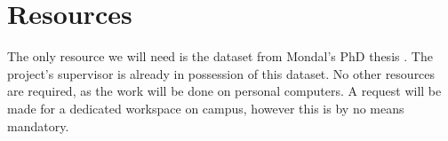 \documentclass[informationsecurity]{gucmasterproject}
\begin{document}
%           

\section{Resources}
\label{sec:milestones-resources}
The only resource we will need is the dataset from Mondal's PhD thesis \cite{mondal}. The project's supervisor is already in possession of this dataset.
No other resources are required, as the work will be done on personal computers.
A request will be made for a dedicated workspace on campus, however this is by no means mandatory.
\end{document}
